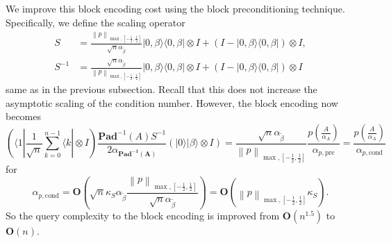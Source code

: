 \documentclass[letterpaper,onecolumn,11pt,accepted=2026-02-14]{quantumarticle}
\newcommand{\norm}[1]{\left\lVert#1\right\rVert}
\theoremstyle{remark}
\theoremstyle{plain}
\newcommand{\ket}[1]{|#1\rangle}
\newcommand{\bra}[1]{\langle#1|}
\newcommand{\ketbra}[2]{\ket{#1}\!\bra{#2}}
\begin{document}
We improve this block encoding cost using the block preconditioning technique. Specifically, we define the scaling operator
\begin{equation}
\begin{aligned}
    S&=\frac{\norm{p}_{\max,\left[-\frac{1}{2},\frac{1}{2}\right]}}{\sqrt{n}\alpha_{\widetilde{\beta}}}\ketbra{0,\beta}{0,\beta}\otimes I+\left(I-\ketbra{0,\beta}{0,\beta}\right)\otimes I,\\
    S^{-1}&=\frac{\sqrt{n}\alpha_{\widetilde{\beta}}}{\norm{p}_{\max,\left[-\frac{1}{2},\frac{1}{2}\right]}}\ketbra{0,\beta}{0,\beta}\otimes I+\left(I-\ketbra{0,\beta}{0,\beta}\right)\otimes I
\end{aligned}
\end{equation}
same as in the previous subsection. Recall that this does not increase the asymptotic scaling of the condition number. However, the block encoding now becomes
    \begin{equation}
        \left(\bra{1}\frac{1}{\sqrt{n}}\sum_{k=0}^{n-1}\bra{k}\otimes I\right)
        \frac{\mathbf{Pad}^{-1}(A)S^{-1}}{2\alpha_{\scriptscriptstyle \mathbf{Pad^{-1}(A)}}}
        \left(\ket{0}\ket{\beta}\otimes I\right)
        =\frac{\sqrt{n}\alpha_{\widetilde{\beta}}}{\norm{p}_{\max,\left[-\frac{1}{2},\frac{1}{2}\right]}}\frac{p\left(\frac{A}{\alpha_A}\right)}{\alpha_{p,\text{pre}}}
        =\frac{p\left(\frac{A}{\alpha_A}\right)}{\alpha_{p,\text{cond}}}
    \end{equation}
for
\begin{equation}
    \alpha_{p,\text{cond}}
    =\mathbf{O}\left(\sqrt{n}\kappa_S \alpha_{\widetilde\beta}
    \frac{\norm{p}_{\max,\left[-\frac{1}{2},\frac{1}{2}\right]}}{\sqrt{n}\alpha_{\widetilde{\beta}}}\right)
    =\mathbf{O}\left(\norm{p}_{\max,\left[-\frac{1}{2},\frac{1}{2}\right]}\kappa_S\right).
\end{equation}
So the query complexity to the block encoding is improved from $\mathbf{O}(n^{1.5})$ to $\mathbf{O}(n)$.
\end{document}
